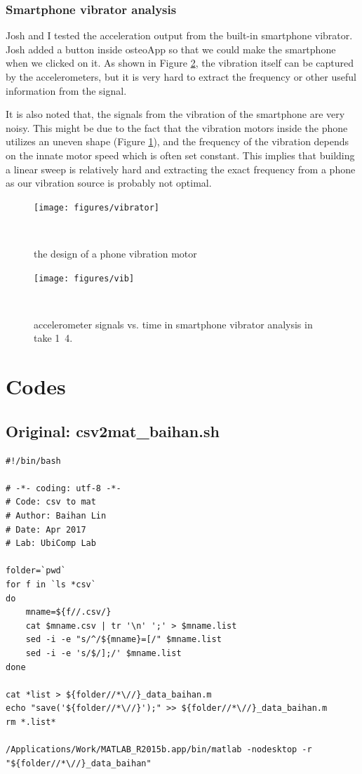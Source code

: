 \documentclass{sigchi}
\begin{document}
\subsubsection{Smartphone vibrator analysis} 

Josh and I tested the acceleration output from the built-in smartphone vibrator. Josh added a button inside osteoApp so that we could make the smartphone when we clicked on it. As shown in Figure \ref{fig:vib}, the vibration itself can be captured by the accelerometers, but it is very hard to extract the frequency or other useful information from the signal.

It is also noted that, the signals from the vibration of the smartphone are very noisy. This might be due to the fact that the vibration motors inside the phone utilizes an uneven shape (Figure \ref{fig:vibrator}), and the frequency of the vibration depends on the innate motor speed which is often set constant. This implies that building a linear sweep is relatively hard and extracting the exact frequency from a phone as our vibration source is probably not optimal.

\begin{figure}
\centering
  \texttt{[image: figures/vibrator]}
  \caption{the design of a phone vibration motor}~\label{fig:vibrator}
\end{figure}

\begin{figure}
  \centering
  \texttt{[image: figures/vib]}
  \caption{accelerometer signals vs. time in smartphone vibrator analysis in take 1~4.}
    ~\label{fig:vib}
\end{figure}


\section{Codes}

\subsection{Original: csv2mat\_baihan.sh}\label{ss:csv2mat}
\begin{lstlisting}
#!/bin/bash

# -*- coding: utf-8 -*-
# Code: csv to mat
# Author: Baihan Lin
# Date: Apr 2017
# Lab: UbiComp Lab

folder=`pwd`
for f in `ls *csv`
do
    mname=${f//.csv/}
    cat $mname.csv | tr '\n' ';' > $mname.list 
    sed -i -e "s/^/${mname}=[/" $mname.list
    sed -i -e 's/$/];/' $mname.list
done

cat *list > ${folder//*\//}_data_baihan.m
echo "save('${folder//*\//}');" >> ${folder//*\//}_data_baihan.m
rm *.list*

/Applications/Work/MATLAB_R2015b.app/bin/matlab -nodesktop -r "${folder//*\//}_data_baihan"
\end{lstlisting}
\end{document}
